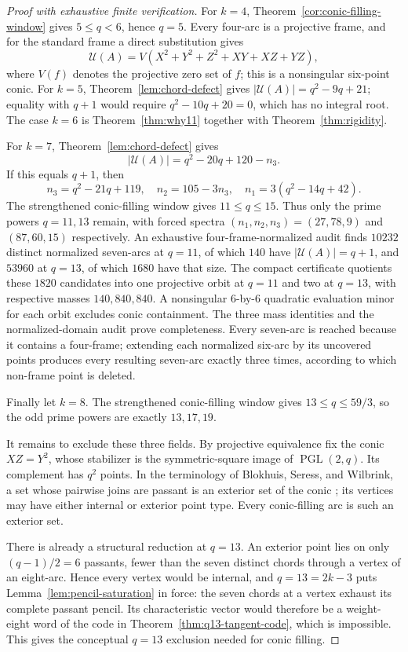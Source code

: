 \documentclass[11pt]{article}
\theoremstyle{remark}
\newcommand{\cU}{\mathcal{U}}
\begin{document}
\begin{proof}[Proof with exhaustive finite verification]
For $k=4$, Theorem~\ref{cor:conic-filling-window} gives
$5\le q<6$, hence $q=5$. Every four-arc is a projective frame, and for the
standard frame a direct substitution gives
\[
 \cU(A)=V(X^2+Y^2+Z^2+XY+XZ+YZ),
\]
where $V(f)$ denotes the projective zero set of $f$; this is a nonsingular
six-point conic. For $k=5$, Theorem~\ref{lem:chord-defect} gives
$|\cU(A)|=q^2-9q+21$; equality with $q+1$ would require
$q^2-10q+20=0$, which has no integral root. The case $k=6$ is
Theorem~\ref{thm:why11} together with Theorem~\ref{thm:rigidity}.

For $k=7$, Theorem~\ref{lem:chord-defect} gives
\[
 |\cU(A)|=q^2-20q+120-n_3.
\]
If this equals $q+1$, then
\[
 n_3=q^2-21q+119,\quad
n_2=105-3n_3,\quad
 n_1=3(q^2-14q+42).
\]
The strengthened conic-filling window gives $11\le q\le15$. Thus only the
prime powers $q=11,13$ remain, with forced spectra
$(n_1,n_2,n_3)=(27,78,9)$ and $(87,60,15)$ respectively. An exhaustive
four-frame-normalized audit finds $10232$ distinct normalized seven-arcs at
$q=11$, of which $140$ have $|\cU(A)|=q+1$, and $53960$ at $q=13$, of which
$1680$ have that size.  The compact certificate quotients these $1820$
candidates into one projective orbit at $q=11$ and two at $q=13$, with
respective masses $140,840,840$.  A nonsingular $6$-by-$6$ quadratic
evaluation minor for each orbit excludes conic containment.  The three mass
identities and the normalized-domain audit prove completeness.  Every
seven-arc is reached because it contains a four-frame; extending each
normalized six-arc by its uncovered points produces every resulting
seven-arc exactly three times, according to which non-frame point is deleted.

Finally let $k=8$. The strengthened conic-filling window gives
$13\le q\le59/3$, so the odd prime powers are exactly $13,17,19$.

It remains to exclude these three fields. By projective equivalence fix the
conic $XZ=Y^2$, whose stabilizer is the symmetric-square image of
$\operatorname{PGL}(2,q)$. Its complement has $q^2$ points. In the
terminology of Blokhuis, Seress, and Wilbrink, a set whose pairwise joins
are passant is an exterior set of the conic
\cite[pp.~143,146]{BSW1992}; its vertices may have either internal or
exterior point type. Every conic-filling arc is such an exterior set.

There is already a structural reduction at $q=13$. An exterior point lies
on only $(q-1)/2=6$ passants, fewer than the seven distinct chords through
a vertex of an eight-arc. Hence every vertex would be internal, and
$q=13=2k-3$ puts Lemma~\ref{lem:pencil-saturation} in force: the seven
chords at a vertex exhaust its complete passant pencil.  Its characteristic vector
would therefore be a weight-eight word of the code in
Theorem~\ref{thm:q13-tangent-code}, which is impossible.  This gives the
conceptual $q=13$ exclusion needed for conic filling.


\end{proof}
\end{document}
